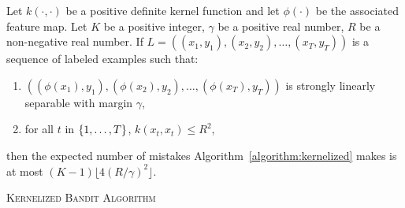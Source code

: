 \begin{theorem}
\label{theorem:kernelized-upper-bound}
Let $k(\cdot, \cdot)$ be a positive definite kernel function and let
$\phi(\cdot)$ be the associated feature map. Let $K$ be a positive integer,
$\gamma$ be a positive real number, $R$ be a non-negative real number. If $L =
((x_1, y_1), (x_2, y_2), \dots, (x_T, y_T))$ is a sequence of labeled examples
such that:
\begin{enumerate}
  \item $((\phi(x_1), y_1), (\phi(x_2), y_2), \dots, (\phi(x_T), y_T))$ is strongly linearly separable with margin $\gamma$,
  \item for all $t$ in $\cbr{1,\ldots,T}$, $k(x_t,x_t) \le R^2$,
\end{enumerate}
then the expected number of mistakes Algorithm~\ref{algorithm:kernelized} makes
is at most $(K-1) \lfloor 4(R/\gamma)^2 \rfloor$.
\end{theorem}

\begin{algorithm}[h]
\caption{\textsc{Kernelized Bandit Algorithm}
\label{algorithm:kernelized}}
\begin{algorithmic}[1]
{
\ELSE
{}
\ENDIF
\ELSE
{}
\ELSE
{}
\ENDIF
\ENDIF
\ENDFOR
}
\end{algorithmic}
\end{algorithm}
